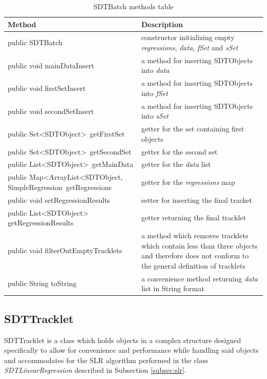\begin{table}[H]
\centering
\setlength{\extrarowheight}{2pt}
\begin{tabularx}{\textwidth}{|X|X|}
\hline
\textbf{Method} & \textbf{Description} \\ \hline
public \mbox{SDTBatch} & constructor initializing empty \emph{regressions}, \emph{data}, \emph{fSet} and \emph{sSet} \\ \hline
public void \mbox{mainDataInsert} & a method for inserting \mbox{SDTObjects} into \emph{data} \\ \hline
public void \mbox{firstSetInsert} & a method for inserting \mbox{SDTObjects} into \emph{fSet} \\ \hline
public void \mbox{secondSetInsert} & a method for inserting \mbox{SDTObjects} into \emph{sSet} \\ \hline
public \mbox{Set<SDTObject> getFirstSet} & getter for the set containing first objects \\ \hline
public \mbox{Set<SDTObject> getSecondSet} & getter for the second set \\ \hline
public \mbox{List<SDTObject> getMainData} & getter for the \emph{data} list \\ \hline
public \mbox{Map<ArrayList<SDTObject,} \mbox{SimpleRegression getRegressions} & getter for the \emph{regressions} map \\ \hline
public void \mbox{setRegressionResults} & setter for inserting the final tracket \\ \hline
public \mbox{List<SDTObject>} \mbox{getRegressionResults} & getter returning the final tracklet \\ \hline
public void \mbox{filterOutEmptyTracklets} & a method which removes tracklets which contain less than three objects and therefore does not conform to the general definition of tracklets \\ \hline
public String \mbox{toString} & a convenience method returning \emph{data} list in String format \\ \hline
\end{tabularx}
\caption{SDTBatch methods table}
\label{tab:class_methods_B}
\end{table}

\subsection{SDTTracklet}\label{subsec:tracklet}

	SDTTracklet is a class which holds objects in a complex structure designed specifically to allow for convenience and performance while handling said objects and accommodates for the SLR algorithm performed in the class \emph{SDTLinearRegression} described in Subsection \ref{subsec:slr}.
	
